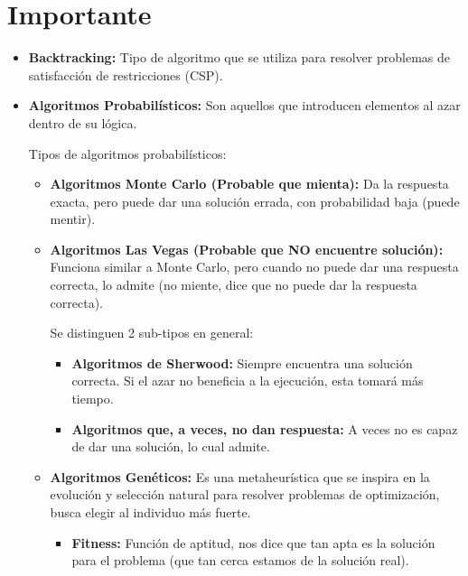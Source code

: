 \documentclass{templateNote}
\begin{document}
\portada
\margenes %

\section{Importante}
\begin{itemize}
    \item \textbf{Backtracking:} Tipo de algoritmo que se utiliza para resolver problemas de satisfacción de restricciones (CSP).
    \item \textbf{Algoritmos Probabilísticos:} Son aquellos que introducen elementos al azar dentro de su lógica.
    
    Tipos de algoritmos probabilísticos:
    \begin{itemize}
        \item \textbf{Algoritmos Monte Carlo (Probable que mienta):} Da la respuesta exacta, pero puede dar una solución errada, con probabilidad baja (puede mentir).
        \item \textbf{Algoritmos Las Vegas (Probable que NO encuentre solución):} Funciona similar a Monte Carlo, pero cuando no puede dar una respuesta correcta, lo admite (no miente, dice que no puede dar la respuesta correcta).
        
        Se distinguen 2 sub-tipos en general:
        \begin{itemize}
            \item \textbf{Algoritmos de Sherwood:} Siempre encuentra una solución correcta. Si el azar no beneficia a la ejecución, esta tomará más tiempo.
            \item \textbf{Algoritmos que, a veces, no dan respuesta:} A veces no es capaz de dar una solución, lo cual admite.
        \end{itemize}
        
        \item \textbf{Algoritmos Genéticos:} Es una metaheurística que se inspira en la evolución y selección natural para resolver problemas de optimización, busca elegir al individuo más fuerte.
        
        \begin{itemize}
            \item \textbf{Fitness:} Función de aptitud, nos dice que tan apta es la solución para el problema (que tan cerca estamos de la solución real).
        \end{itemize}
        

\end{itemize}
\end{itemize}
\end{document}
